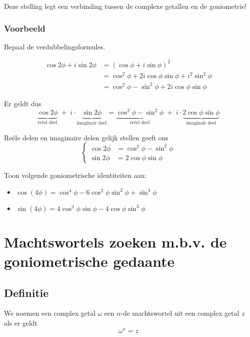 \documentclass[12pt,twoside,a4]{article}
\begin{document}
Deze stelling legt een verbinding tussen de complexe getallen en de goniometrie!

\subsubsection*{Voorbeeld}

Bepaal de verdubbelingsformules.

\begin{align*}
  \cos 2\phi + i \sin 2\phi &= (\cos \phi + i \sin \phi)^2\\
                      &= \cos^2 \phi + 2i\cos\phi\sin\phi + i^2\sin^2\phi\\
                      &= \cos^2\phi - \sin^2\phi + 2i\cos\phi\sin\phi
\end{align*}

Er geldt dus
\[ \underbrace{\cos 2\phi}_{\text{reëel deel}} \;+ \;i \cdot \underbrace{\sin 2\phi}_{\text{imaginair deel}}
  = \underbrace{\cos^2\phi - \sin^2\phi}_{\text{reëel deel}} \; + \; i \cdot \underbrace{2\cos\phi\sin\phi}_{\text{imaginair deel}} \]

Reële delen en imaginaire delen gelijk stellen geeft ons
\[
  \begin{cases}
    \cos 2\phi &= \cos^2\phi - \sin^2\phi \\
    \sin 2\phi &= 2 \cos\phi \sin\phi
  \end{cases}
\]

\begin{oefening}
  Toon volgende goniometrische identiteiten aan:
  \begin{itemize}
  \item $\cos(4\phi) = \cos^4\phi - 6 \cos^2\phi \sin^2\phi + \sin^4\phi $
  \item $\sin(4\phi) = 4\cos^3\phi \sin\phi - 4 \cos\phi \sin^3\phi $
  \end{itemize}
\end{oefening}

\pagebreak

\section{Machtswortels zoeken m.b.v. de goniometrische gedaante}

\subsection{Definitie}

We noemen een complex getal $\omega$ een $n$-de machtswortel uit een complex getal $z$ als er geldt
\[\omega^n = z\]
\end{document}
